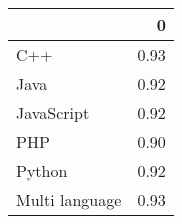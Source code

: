\begin{tabular}{lr}
\toprule
{} &    0 \\
\midrule
C++            & 0.93 \\
Java           & 0.92 \\
JavaScript     & 0.92 \\
PHP            & 0.90 \\
Python         & 0.92 \\
Multi language & 0.93 \\
\bottomrule
\end{tabular}
